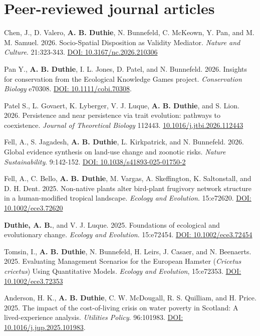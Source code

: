 \documentclass[letterpaper]{article}
\begin{document}
\section*{Peer-reviewed journal articles}
\begin{etaremune}
\item Chen, J., D. Valero, {\bf A. B. Duthie}, N. Bunnefeld, C. McKeown, Y. Pan, and M. M. Samuel. 2026. Socio-Spatial Disposition as Validity Mediator. \textit{Nature and Culture}. 21:323-343. \href{https://www.berghahnjournals.com/view/journals/nature-and-culture/21/3/nc210306.xml?ArticleBodyColorStyles=pdf-11684}{DOI: 10.3167/nc.2026.210306}
\item Pan Y., {\bf A. B. Duthie}, I. L. Jones, D. Patel, and N. Bunnefeld. 2026. Insights for conservation from the Ecological Knowledge Games project. \textit{Conservation Biology} e70308. \href{https://doi.org/10.1111/cobi.70308}{DOI: 10.1111/cobi.70308}.
\item Patel S., L. Govaert, K. Lyberger, V. J. Luque, {\bf A. B. Duthie}, and S. Lion. 2026. Persistence and near persistence via trait evolution: pathways to coexistence. \textit{Journal of Theoretical Biology} 112443. \href{https://doi.org/10.1016/j.jtbi.2026.112443}{10.1016/j.jtbi.2026.112443} 
\item Fell, A., S. Jagadesh, {\bf A. B. Duthie}, L. Kirkpatrick, and N. Bunnefeld. 2026. Global evidence synthesis on land-use change and zoonotic risks. \textit{Nature Sustainability}. 9:142-152. \href{https://doi.org/10.1038/s41893-025-01750-2}{DOI: 10.1038/s41893-025-01750-2}
\item Fell, A., C. Bello, {\bf A. B. Duthie}, M. Vargas, A. Skeffington, K. Saltonstall, and D. H. Dent. 2025. Non-native plants alter bird-plant frugivory network structure in a human-modified tropical landscape. \textit{Ecology and Evolution}. 15:e72620. \href{https://doi.org/10.1002/ece3.72620}{DOI: 10.1002/ece3.72620}
\item {\bf Duthie, A. B.}, and V. J. Luque. 2025. Foundations of ecological and evolutionary change. \textit{Ecology and Evolution}. 15:e72454. \href{https://doi.org/10.1002/ece3.72454}{DOI: 10.1002/ece3.72454}
\item Tomsin, I., {\bf A. B. Duthie}, N. Bunnefeld, H. Leirs, J. Casaer, and N. Beenaerts. 2025. Evaluating Management Scenarios for the European Hamster (\textit{Cricetus cricetus}) Using Quantitative Models. \textit{Ecology and Evolution}, 15:e72353. \href{https://doi.org/10.1002/ece3.72353}{DOI: 10.1002/ece3.72353}
\item Anderson, H. K., {\bf A. B. Duthie}, C. W. McDougall, R. S. Quilliam, and H. Price. 2025. The impact of the cost-of-living crisis on water poverty in Scotland: A lived-experience analysis. {\it Utilities Policy}. 96:101983. \href{https://doi.org/10.1016/j.jup.2025.101983}{DOI: 10.1016/j.jup.2025.101983}.

\end{etaremune}
\end{document}
